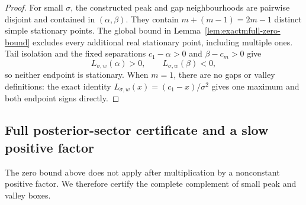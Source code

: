 \begin{proof}
For small \(\sigma\), the constructed peak and gap neighbourhoods are
pairwise disjoint and contained in \((\alpha,\beta)\).  They contain
\(m+(m-1)=2m-1\) distinct simple stationary points.  The global bound in
Lemma~\ref{lem:exactmfull-zero-bound} excludes every additional real
stationary point, including multiple ones.  Tail isolation and the fixed
separations \(c_1-\alpha>0\) and \(\beta-c_m>0\) give
\begin{equation}
 L_{\sigma,w}(\alpha)>0,
 \qquad L_{\sigma,w}(\beta)<0,
 \label{eq:exactmfull-endpoint-signs}
\end{equation}
so neither endpoint is stationary.  When \(m=1\), there are no gaps or
valley definitions: the exact identity
\(L_{\sigma,w}(x)=(c_1-x)/\sigma^2\) gives one maximum and both endpoint
signs directly.
\end{proof}

\subsection{Full posterior-sector certificate and a slow positive factor}
\label{subsec:exactmfull-slow-factor}

The zero bound above does not apply after multiplication by a nonconstant
positive factor.  We therefore certify the complete complement of small peak
and valley boxes.

